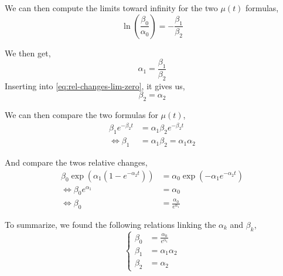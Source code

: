 We can then compute the limits toward infinity for the two $\mu(t)$ formulas,
\begin{equation}
	\ln\left(  \frac{\beta_0}{\alpha_0} \right) = - \frac{\beta_1}{\beta_2}
\end{equation}

We then get, 
\begin{equation}
	\alpha_1 = \frac{\beta_1}{\beta_2}
\end{equation}
Inserting into \autoref{eq:rel-changes-lim-zero}, it gives us,
\begin{equation}
	\beta_2 = \alpha_2
\end{equation}

We can then compare the two formulas for $\mu(t)$,
\begin{align*}
	\beta_1 e^{-\beta_2 t} 
		&= \alpha_1 \beta_2 e^{-\beta_2 t} \\
	\iff \beta_1 
		&= \alpha_1 \beta_2 = \alpha_1 \alpha_2
\end{align*}

And compare the twos relative changes,
\begin{align*}
	\beta_0 \exp\left( \alpha_1 (1 - e^{-\alpha_2 t}) \right)
		&= \alpha_0 \exp(-\alpha_1 e^{-\alpha_2 t}) \\
	\iff \beta_0 e^{\alpha_1} 
		&= \alpha_0 \\
	\iff \beta_0
		&= \frac{\alpha_0}{e^{\alpha_1}}
\end{align*}

To summarize, we found the following relations linking the $\alpha_k$ and $\beta_k$,
\begin{equation}
	\begin{cases}
		\beta_0 &= \frac{\alpha_0}{e^{\alpha_1}} \\
		\beta_1 &= \alpha_1 \alpha_2 \\
		\beta_2 &= \alpha_2
	\end{cases}
\end{equation}